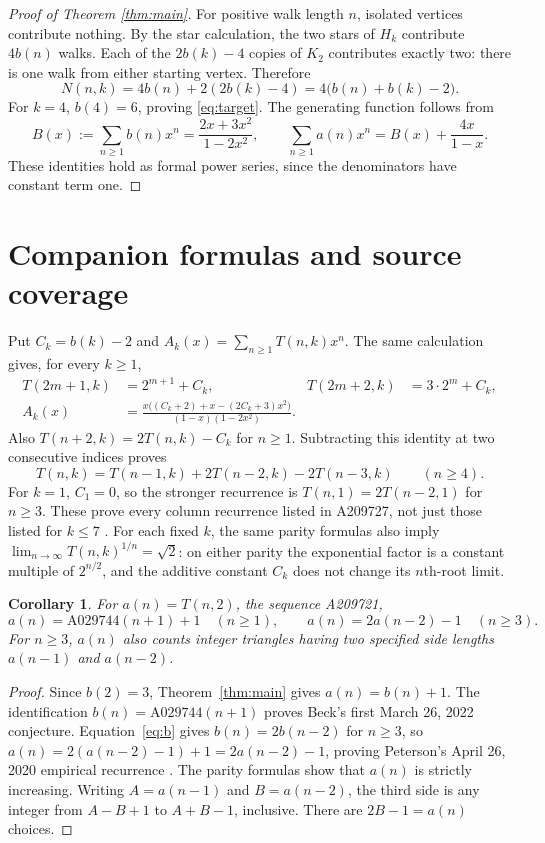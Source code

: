 \documentclass[11pt]{article}
\newtheorem{corollary}{Corollary}
\begin{document}
\begin{proof}[Proof of Theorem \ref{thm:main}]
For positive walk length $n$, isolated vertices contribute nothing.
By the star calculation, the two stars of $H_k$ contribute $4b(n)$
walks. Each of the $2b(k)-4$ copies of $K_2$ contributes exactly two:
there is one walk from either starting vertex. Therefore
\[
 N(n,k)=4b(n)+2(2b(k)-4)=4\bigl(b(n)+b(k)-2\bigr).
\]
For $k=4$, $b(4)=6$, proving \eqref{eq:target}.
The generating function follows from
\begin{equation}\label{eq:gf}
 B(x):=\sum_{n\geq1}b(n)x^n=\frac{2x+3x^2}{1-2x^2},\qquad
 \sum_{n\geq1}a(n)x^n=B(x)+\frac{4x}{1-x}.
\end{equation}
These identities hold as formal power series, since the denominators
have constant term one.
\end{proof}

\section{Companion formulas and source coverage}
Put $C_k=b(k)-2$ and $A_k(x)=\sum_{n\geq1}T(n,k)x^n$.
The same calculation gives, for every $k\geq1$,
\begin{align}
 T(2m+1,k)&=2^{m+1}+C_k,&
 T(2m+2,k)&=3\cdot2^m+C_k,\label{eq:companions}\\
 A_k(x)&=\frac{x\bigl((C_k+2)+x-(2C_k+3)x^2\bigr)}
 {(1-x)(1-2x^2)}.\label{eq:generalgf}
\end{align}
Also $T(n+2,k)=2T(n,k)-C_k$ for $n\geq1$.
Subtracting this identity at two consecutive indices proves
\begin{equation}\label{eq:recurrence}
 T(n,k)=T(n-1,k)+2T(n-2,k)-2T(n-3,k)\qquad(n\geq4).
\end{equation}
For $k=1$, $C_1=0$, so the stronger recurrence is
$T(n,1)=2T(n-2,1)$ for $n\geq3$.
These prove every column recurrence listed in A209727, not just those
listed for $k\leq7$ \cite{a209727}.
For each fixed $k$, the same parity formulas also imply
$\lim_{n\to\infty}T(n,k)^{1/n}=\sqrt{2}$: on either parity the
exponential factor is a constant multiple of $2^{n/2}$, and the
additive constant $C_k$ does not change its $n$th-root limit.

\begin{corollary}\label{cor:beck-peterson}
For $a(n)=T(n,2)$, the sequence A209721,
\[
 a(n)=\mathrm{A029744}(n+1)+1\quad(n\geq1),\qquad
 a(n)=2a(n-2)-1\quad(n\geq3).
\]
For $n\geq3$, $a(n)$ also counts integer triangles having two specified
side lengths $a(n-1)$ and $a(n-2)$.
\end{corollary}
\begin{proof}
Since $b(2)=3$, Theorem~\ref{thm:main} gives $a(n)=b(n)+1$.
The identification $b(n)=\mathrm{A029744}(n+1)$ proves Beck's first
March 26, 2022 conjecture. Equation~\eqref{eq:b} gives
$b(n)=2b(n-2)$ for $n\geq3$, so
$a(n)=2(a(n-2)-1)+1=2a(n-2)-1$, proving Peterson's April 26, 2020
empirical recurrence \cite{a209721}.
The parity formulas show that $a(n)$ is strictly increasing.
Writing $A=a(n-1)$ and $B=a(n-2)$, the third side is any integer from
$A-B+1$ to $A+B-1$, inclusive. There are $2B-1=a(n)$ choices.
\end{proof}
\end{document}
